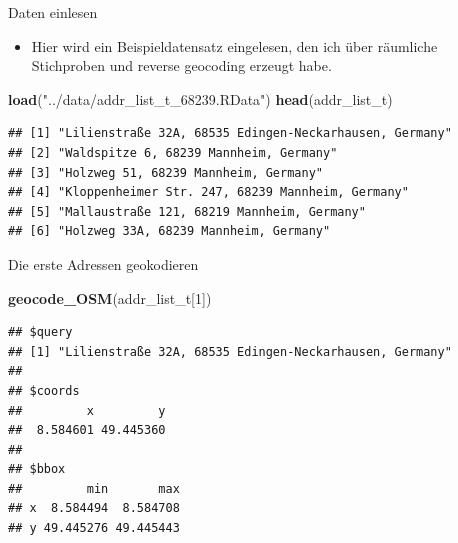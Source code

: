 \documentclass[ignorenonframetext,]{beamer}
\newenvironment{Shaded}{\begin{snugshade}}{\end{snugshade}}
\newcommand{\DecValTok}[1]{\textcolor[rgb]{0.27,0.67,0.26}{#1}}
\newcommand{\KeywordTok}[1]{\textcolor[rgb]{0.26,0.66,0.93}{\textbf{#1}}}
\newcommand{\NormalTok}[1]{\textcolor[rgb]{0.74,0.68,0.62}{#1}}
\newcommand{\StringTok}[1]{\textcolor[rgb]{0.02,0.61,0.04}{#1}}
\providecommand{\tightlist}{%
  \setlength{\itemsep}{0pt}\setlength{\parskip}{0pt}}
\begin{document}
\begin{frame}[fragile]{Daten einlesen}
\protect\hypertarget{daten-einlesen}{}

\begin{itemize}
\tightlist
\item
  Hier wird ein Beispieldatensatz eingelesen, den ich über räumliche
  Stichproben und reverse geocoding erzeugt habe.
\end{itemize}

\begin{Shaded}
\begin{Highlighting}[]
\KeywordTok{load}\NormalTok{(}\StringTok{"../data/addr_list_t_68239.RData"}\NormalTok{)}
\KeywordTok{head}\NormalTok{(addr_list_t)}
\end{Highlighting}
\end{Shaded}

\begin{verbatim}
## [1] "Lilienstraße 32A, 68535 Edingen-Neckarhausen, Germany"
## [2] "Waldspitze 6, 68239 Mannheim, Germany"                
## [3] "Holzweg 51, 68239 Mannheim, Germany"                  
## [4] "Kloppenheimer Str. 247, 68239 Mannheim, Germany"      
## [5] "Mallaustraße 121, 68219 Mannheim, Germany"            
## [6] "Holzweg 33A, 68239 Mannheim, Germany"
\end{verbatim}

\end{frame}

\begin{frame}[fragile]{Die erste Adressen geokodieren}
\protect\hypertarget{die-erste-adressen-geokodieren}{}

\begin{Shaded}
\begin{Highlighting}[]
\KeywordTok{geocode_OSM}\NormalTok{(addr_list_t[}\DecValTok{1}\NormalTok{])}
\end{Highlighting}
\end{Shaded}

\begin{verbatim}
## $query
## [1] "Lilienstraße 32A, 68535 Edingen-Neckarhausen, Germany"
## 
## $coords
##         x         y 
##  8.584601 49.445360 
## 
## $bbox
##         min       max
## x  8.584494  8.584708
## y 49.445276 49.445443
\end{verbatim}

\end{frame}
\end{document}
